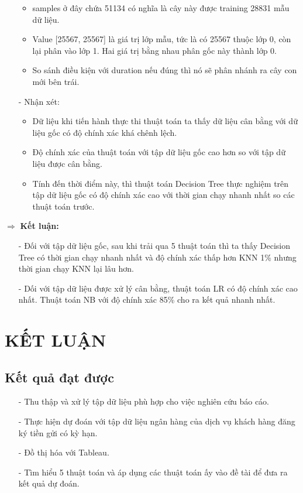 \documentclass{report}
\begin{document}
\begin{enumerate}
\begin{itemize}
            \item samples ở đây chứa 51134 có nghĩa là cây này được training 28831 mẫu dữ liệu.
            \item Value [25567, 25567] là giá trị lớp mẫu, tức là có 25567 thuộc lớp 0, còn lại phân vào lớp 1. Hai giá trị bằng nhau phân gốc này thành lớp 0.
            \item So sánh điều kiện với duration nếu đúng thì nó sẽ phân nhánh ra cây con mới bên trái.
    \end{itemize}
\item [- ]	Nhận xét:
     \begin{itemize}
            \item Dữ liệu khi tiến hành thực thi thuật toán ta thấy dữ liệu cân bằng với dữ liệu gốc có độ chính xác khá chênh lệch.
            \item Độ chính xác của thuật toán với tập dữ liệu gốc cao hơn so với tập dữ liệu được cân bằng.
            \item Tính đến thời điểm này, thì thuật toán Decision Tree thực nghiệm trên tập dữ liệu gốc có độ chính xác cao với thời gian chạy nhanh nhất so các thuật toán trước.
    \end{itemize}
    \end{enumerate}
    $\Rightarrow$ \textbf{Kết luận: }
    \begin{enumerate}
    \item [- ] Đối với tập dữ liệu gốc, sau khi trải qua 5 thuật toán thì ta thấy Decision Tree có thời gian chạy nhanh nhất và độ chính xác thấp hơn KNN 1\% nhưng thời gian chạy KNN lại lâu hơn.  
    \item [- ] Dối với tập dữ liệu được xử lý cân bằng, thuật toán LR có độ chính xác cao nhất. Thuật toán NB với độ chính xác 85\% cho ra kết quả nhanh nhất.
    \end{enumerate}
    
\fontsize{16}{10}\selectfont
\chapter{KẾT LUẬN}
\fontsize{14}{10}\selectfont
\section{Kết quả đạt được}
     \fontsize{13}{14}\selectfont
     \begin{enumerate}
     \item [- ] Thu thập và xử lý tập dữ liệu phù hợp cho việc nghiên cứu báo cáo.
    \item [- ] Thực hiện dự đoán với tập dữ liệu ngân hàng của dịch vụ khách hàng đăng ký tiền gửi có kỳ hạn.
    \item[- ] Đồ thị hóa với Tableau.
    \item [- ] Tìm hiểu 5 thuật toán và áp dụng các thuật toán ấy vào đề tài để đưa ra kết quả dự đoán.
    \end{enumerate}
\end{document}
